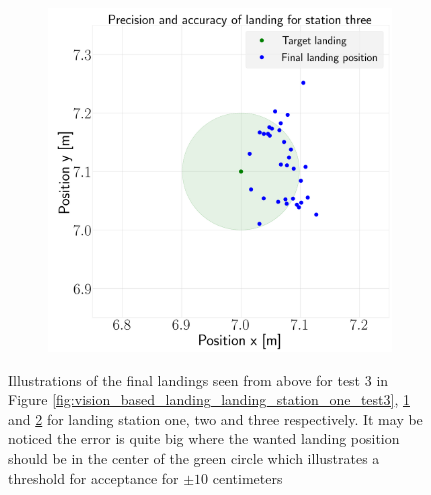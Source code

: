 \documentclass[../Head/report.tex]{subfiles}
\begin{document}
\begin{figure}[H]
\begin{subfigure}[t]{.30\textwidth}
        \caption{}
        \label{fig:vision_based_landing_landing_station_two_test3}
    \end{subfigure}
     \hspace{0.2em}
    \begin{subfigure}[t]{.30\textwidth}
        \centering
        \includegraphics[width=\textwidth]{../Figures/landing_test/test3_speed_0.9_error_0.1/landing_for_station_three.png}
        \caption{}
        \label{fig:vision_based_landing_landing_station_three_test3}
    \end{subfigure}
    \caption{Illustrations of the final landings seen from above for test 3 in Figure \ref{fig:vision_based_landing_landing_station_one_test3}, \ref{fig:vision_based_landing_landing_station_two_test3} and \ref{fig:vision_based_landing_landing_station_three_test3} for landing station one, two and three respectively. It may be noticed the error is quite big where the wanted landing position should be in the center of the green circle which illustrates a threshold for acceptance for $\pm 10$ centimeters}
    \label{fig:vision_based_landing_test3}
\end{figure}
\end{document}
